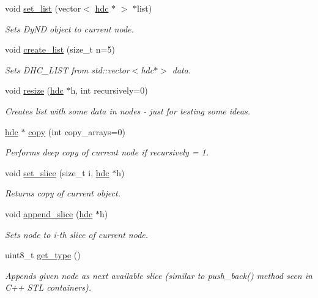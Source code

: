 \begin{DoxyCompactItemize}
\item 
void \hyperlink{a00003_ae3cf31bad48437a48ad1291e2db99873}{set\+\_\+list} (vector$<$ \hyperlink{a00003}{hdc} $\ast$ $>$ $\ast$list)
\begin{DoxyCompactList}\small\item\em Sets Dy\+ND object to current node. \end{DoxyCompactList}\item 
void \hyperlink{a00003_ab88feab4710f598b8a56b529fd01dede}{create\+\_\+list} (size\+\_\+t n=5)
\begin{DoxyCompactList}\small\item\em Sets D\+H\+C\+\_\+\+L\+I\+ST from std\+::vector$<$hdc$\ast$$>$ data. \end{DoxyCompactList}\item 
void \hyperlink{a00003_ad782f111cf0c869166ed9f4ac51405a6}{resize} (\hyperlink{a00003}{hdc} $\ast$h, int recursively=0)
\begin{DoxyCompactList}\small\item\em Creates list with some data in nodes -\/ just for testing some ideas. \end{DoxyCompactList}\item 
\hyperlink{a00003}{hdc} $\ast$ \hyperlink{a00003_af5d54732a2d9d34f7f2f8453acda21d6}{copy} (int copy\+\_\+arrays=0)
\begin{DoxyCompactList}\small\item\em Performs deep copy of current node if recursively = 1. \end{DoxyCompactList}\item 
void \hyperlink{a00003_a3d4c2ba09c79e2dfbe7be7bd59bd811e}{set\+\_\+slice} (size\+\_\+t i, \hyperlink{a00003}{hdc} $\ast$h)
\begin{DoxyCompactList}\small\item\em Returns copy of current object. \end{DoxyCompactList}\item 
void \hyperlink{a00003_aaffff0cd041746fd45a2d2c67d73ce75}{append\+\_\+slice} (\hyperlink{a00003}{hdc} $\ast$h)
\begin{DoxyCompactList}\small\item\em Sets node to i-\/th slice of current node. \end{DoxyCompactList}\item 
uint8\+\_\+t \hyperlink{a00003_ac12e6d9074533304ea4d3eb08623d774}{get\+\_\+type} ()
\begin{DoxyCompactList}\small\item\em Appends given node as next available slice (similar to push\+\_\+back() method seen in C++ S\+TL containers). \end{DoxyCompactList}\item 

\end{DoxyCompactItemize}

